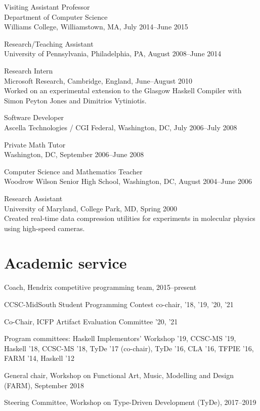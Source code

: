 \documentclass[12pt]{article}
\newcommand{\cvitem}{\par\hangpara{2em}{1}}
\begin{document}
\cvitem
Visiting Assistant Professor \\
Department of Computer Science \\
Williams College, Williamstown, MA, July 2014--June 2015

\cvitem
Research/Teaching Assistant \\
University of Pennsylvania, Philadelphia, PA, August 2008--June 2014

\cvitem
Research Intern \\
Microsoft Research, Cambridge, England, June--August 2010 \\
Worked on an experimental extension to the Glasgow Haskell Compiler with
Simon Peyton Jones and Dimitrios Vytiniotis.

\cvitem
Software Developer \\
Ascella Technologies / CGI Federal, Washington,
DC, July 2006--July 2008

\cvitem
Private Math Tutor \\
Washington, DC, September 2006--June 2008

\cvitem
Computer Science and Mathematics Teacher \\
Woodrow Wilson Senior High School, Washington, DC, August 2004--June 2006

\cvitem
Research Assistant \\
University of Maryland, College Park, MD, Spring 2000 \\
Created real-time data compression utilities for experiments in
molecular physics using high-speed cameras.

\section*{Academic service}

\cvitem Coach, Hendrix competitive programming team, 2015--present

\cvitem CCSC-MidSouth Student Programming Contest co-chair, '18, '19, '20, '21

\cvitem Co-Chair, ICFP Artifact Evaluation Committee '20, '21

\cvitem Program committees: Haskell Implementors' Workshop '19,
CCSC-MS '19, Haskell '18, CCSC-MS '18, TyDe '17 (co-chair), TyDe '16,
CLA '16, TFPIE '16, FARM '14, Haskell '12

\cvitem General chair, Workshop on Functional Art, Music, Modelling
and Design (FARM), September 2018

\cvitem Steering Committee, Workshop on Type-Driven Development
(TyDe), 2017--2019
\end{document}
